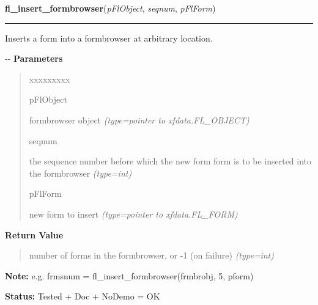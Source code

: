    \label{xformslib:flformbrowser:fl_insert_formbrowser}

    \vspace{0.5ex}

\hspace{.8\funcindent}\begin{boxedminipage}{\funcwidth}

    \raggedright \textbf{fl\_insert\_formbrowser}(\textit{pFlObject}, \textit{seqnum}, \textit{pFlForm})

    \vspace{-1.5ex}

    \rule{\textwidth}{0.5\fboxrule}
\setlength{\parskip}{2ex}

Inserts a form into a formbrowser at arbitrary location.

-{}-
\setlength{\parskip}{1ex}
      \textbf{Parameters}
      \vspace{-1ex}

      \begin{quote}
        \begin{Ventry}{xxxxxxxxx}

          \item[pFlObject]


formbrowser object
            {\it (type=pointer to xfdata.FL\_OBJECT)}

          \item[seqnum]


the sequence number before which the new form form is to be inserted
into the formbrowser
            {\it (type=int)}

          \item[pFlForm]


new form to insert
            {\it (type=pointer to xfdata.FL\_FORM)}

        \end{Ventry}

      \end{quote}

      \textbf{Return Value}
    \vspace{-1ex}

      \begin{quote}

number of forms in the formbrowser, or -1 (on failure)
      {\it (type=int)}

      \end{quote}

\textbf{Note:} 
e.g. frmsnum = fl\_insert\_formbrowser(frmbrobj, 5, pform)


\textbf{Status:} 
Tested + Doc + NoDemo = OK


    \end{boxedminipage}

